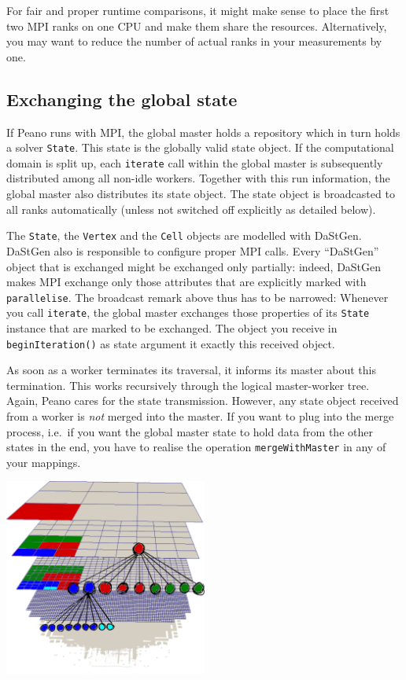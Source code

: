 \begin{remark}
For fair and proper runtime comparisons, it might make sense to place the first
two MPI ranks on one CPU and make them share the resources.
Alternatively, you may want to reduce the number of actual ranks in your
measurements by one.
\end{remark}

\subsection{Exchanging the global state}

If Peano runs with MPI, the global master holds a repository which in turn holds
a solver \texttt{State}. 
This state is the globally valid state object. 
If the computational domain is split up, each \texttt{iterate} call within the
global master is subsequently distributed among all non-idle workers.
Together with this run information, the global master also distributes its state
object.
The state object is broadcasted to all ranks automatically (unless not switched
off explicitly as detailed below).

The \texttt{State}, the \texttt{Vertex} and the \texttt{Cell} objects are
modelled with DaStGen.
DaStGen also is responsible to configure proper MPI calls.
Every ``DaStGen'' object that is exchanged might be exchanged only partially:
indeed, DaStGen makes MPI exchange only those attributes that are explicitly
marked with \texttt{parallelise}.
The broadcast remark above thus has to be narrowed: 
Whenever you call \texttt{iterate}, the global master exchanges those properties
of its \texttt{State} instance that are marked to be exchanged. 
The object you receive in \texttt{beginIteration()} as state argument it exactly
this received object.

As soon as a worker terminates its traversal, it informs its master about this
termination.
This works recursively through the logical master-worker tree.
Again, Peano cares for the state transmission. 
However, any state object received from a worker is {\em not} merged into the
master. 
If you want to plug into the merge process, i.e.~if you want the global master
state to hold data from the other states in the end, you have to realise the
operation \texttt{mergeWithMaster} in any of your mappings.


\begin{center}
  \includegraphics[width=0.5\textwidth]{52_mpi/spacetree-decomposition-top-down.pdf}
\end{center}

